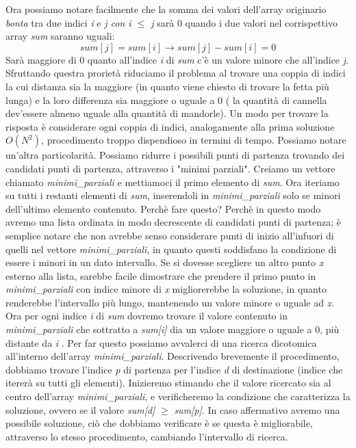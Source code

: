 Ora possiamo notare facilmente che  la somma dei valori dell'array originario \textit{bonta} tra due indici \textit{i} e \textit{j con i $\le$ j} sarà 0 quando i due valori nel corrispettivo array \textit{sum} saranno uguali:
 \[sum [j] = sum[i] \rightarrow sum[j] - sum[i] = 0\]
Sarà maggiore di 0 quanto all'indice \textit{i}  di \textit{sum} c'è un valore minore che all'indice \textit{j}.
Sfruttando questra prorietà riduciamo il problema al trovare una coppia di indici la cui distanza sia la maggiore (in quanto viene chiesto di trovare la fetta più lunga) e la loro differenza sia maggiore o uguale a 0 ( la quantità di cannella dev'essere almeno uguale alla quantità di mandorle).
Un modo per trovare la risposta è considerare ogni coppia di indici, analogamente alla prima soluzione $O(N^2)$, procedimento troppo dispendioso in termini di tempo.
Possiamo notare un'altra particolarità.
Possiamo ridurre i possibili punti di partenza trovando dei candidati punti di partenza, attraverso i "minimi parziali". 
Creiamo un vettore chiamato \textit{minimi\_parziali} e mettiamoci il primo elemento di \textit{sum}. Ora iteriamo su tutti i restanti elementi di \textit{sum}, inserendoli in \textit{minimi\_parziali} solo se minori dell'ultimo elemento contenuto.
Perchè fare questo? Perchè in questo modo avremo una lista ordinata in modo decrescente di candidati punti di partenza; è semplice notare che non avrebbe senso considerare punti di inizio all'infuori di quelli nel vettore \textit{minimi\_parziali}, in quanto questi soddisfano la condizione di essere i minori in un dato intervallo. Se si dovesse scegliere un altro punto \textit{x} esterno alla lista, sarebbe facile dimostrare che prendere il primo punto in \textit{minimi\_parziali} con indice minore di \textit{x} migliorerebbe la soluzione, in quanto renderebbe l'intervallo più lungo, mantenendo un valore minore o uguale ad \textit{x}.
Ora per ogni indice \textit{i} di \textit{sum} dovremo trovare il valore contenuto in \textit{minimi\_parziali} che sottratto a \textit{sum[i]} dia un valore maggiore o uguale a 0, più distante da \textit{i} . Per far questo possiamo avvalerci di una ricerca dicotomica all'interno dell'array \textit{minimi\_parziali}.
Descrivendo brevemente il procedimento, dobbiamo trovare l'indice \textit{p} di partenza per l'indice \textit{d} di destinazione (indice che itererà su tutti gli elementi).
Inizieremo stimando che il valore ricercato sia al centro dell'array \textit{minimi\_parziali}, e verificheremo la condizione che caratterizza la soluzione, ovvero se il valore \textit{sum[d]} $\ge$ \textit{sum[p]}. In caso affermativo avremo una possibile soluzione, ciò che dobbiamo verificare è se questa è migliorabile, attraverso lo stesso procedimento, cambiando l'intervallo di ricerca.

